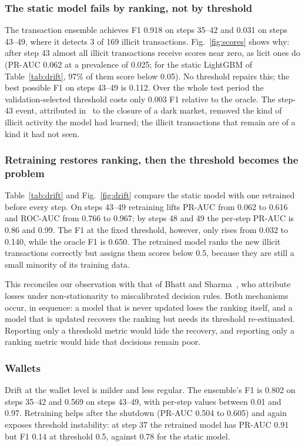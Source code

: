\subsubsection{The static model fails by ranking, not by threshold} The transaction ensemble achieves F1 0.918 on steps 35--42 and 0.031 on steps 43--49, where it detects 3 of 169 illicit transactions. Fig.~\ref{fig:scores} shows why: after step 43 almost all illicit transactions receive scores near zero, as licit ones do (PR-AUC 0.062 at a prevalence of 0.025; for the static LightGBM of Table~\ref{tab:drift}, 97\% of them score below 0.05). No threshold repairs this; the best possible F1 on steps 43--49 is 0.112. Over the whole test period the validation-selected threshold costs only 0.003 F1 relative to the oracle. The step-43 event, attributed in~\cite{weber2019} to the closure of a dark market, removed the kind of illicit activity the model had learned; the illicit transactions that remain are of a kind it had not seen.

\subsubsection{Retraining restores ranking, then the threshold becomes the problem} Table~\ref{tab:drift} and Fig.~\ref{fig:drift} compare the static model with one retrained before every step. On steps 43--49 retraining lifts PR-AUC from 0.062 to 0.616 and ROC-AUC from 0.766 to 0.967; by steps 48 and 49 the per-step PR-AUC is 0.86 and 0.99. The F1 at the fixed threshold, however, only rises from 0.032 to 0.140, while the oracle F1 is 0.650. The retrained model ranks the new illicit transactions correctly but assigns them scores below 0.5, because they are still a small minority of its training data.

This reconciles our observation with that of Bhatt and Sharma~\cite{bhatt2026}, who attribute losses under non-stationarity to miscalibrated decision rules. Both mechanisms occur, in sequence: a model that is never updated loses the ranking itself, and a model that is updated recovers the ranking but needs its threshold re-estimated. Reporting only a threshold metric would hide the recovery, and reporting only a ranking metric would hide that decisions remain poor.

\subsubsection{Wallets} Drift at the wallet level is milder and less regular. The ensemble's F1 is 0.802 on steps 35--42 and 0.569 on steps 43--49, with per-step values between 0.01 and 0.97. Retraining helps after the shutdown (PR-AUC 0.504 to 0.605) and again exposes threshold instability: at step 37 the retrained model has PR-AUC 0.91 but F1 0.14 at threshold 0.5, against 0.78 for the static model.


